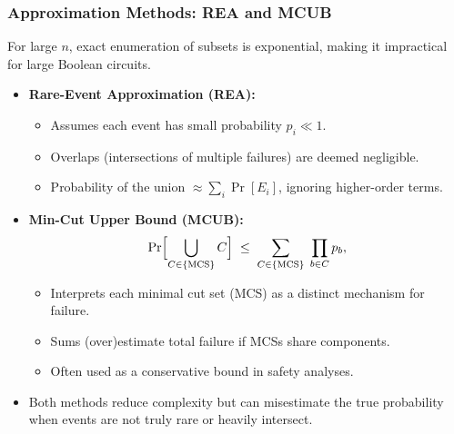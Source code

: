 \begin{frame}[allowframebreaks]
\frametitle{Approximation Methods: REA and MCUB}
 For large \(n\), exact enumeration of subsets is exponential, making it impractical for large Boolean circuits.
 \vspace{8pt}
\begin{itemize}
  \item \textbf{Rare-Event Approximation (REA):}
    \begin{itemize}
      \item Assumes each event has small probability \(p_i \ll 1\).
      \item Overlaps (intersections of multiple failures) are deemed negligible.
      \item Probability of the union \(\approx \sum_{i} \Pr[E_i]\), ignoring higher-order terms.
    \end{itemize}
\framebreak
  \item \textbf{Min-Cut Upper Bound (MCUB):}
    \begin{equation}
    \label{eq:mcub_slides}
      \Pr\Bigl[\bigcup_{C \in \{\mathrm{MCS}\}} C\Bigr]
      \;\le\;
      \sum_{C \in \{\mathrm{MCS}\}}
      \;\prod_{b \in C} p_b ,
    \end{equation}
    \begin{itemize}
      \item Interprets each minimal cut set (MCS) as a distinct mechanism for failure.
      \item Sums (over)estimate total failure if MCSs share components.
      \item Often used as a conservative bound in safety analyses.
    \end{itemize}
  \vspace{6pt}
  \item Both methods reduce complexity but can misestimate the true probability when events are not truly rare or heavily intersect.
\end{itemize}
\end{frame}

